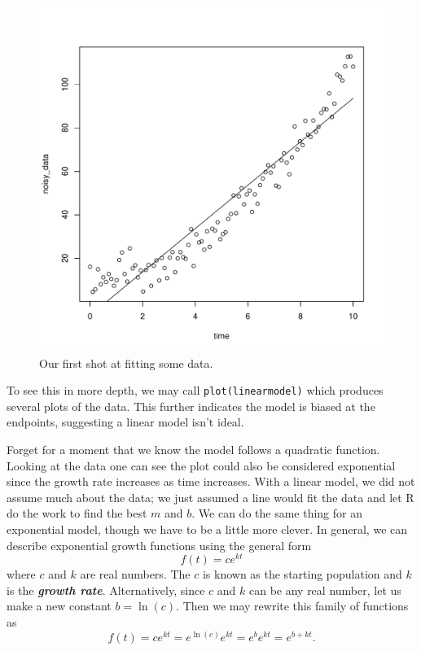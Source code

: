 \documentclass[12pt]{article}
\theoremstyle{remark}
\newcommand{\vocab}[1]{\textbf{\emph{#1}}}
\begin{document}
\begin{figure}[htbp]
\centering
\includegraphics[scale=0.5]{linear_model.pdf}
\caption{Our first shot at fitting some data.}
\label{linear}
\end{figure}

To see this in more depth, we may call \verb|plot(linearmodel)| which produces several plots of the data. This further indicates the model is biased at the endpoints, suggesting a linear model isn't ideal.

Forget for a moment that we know the model follows a quadratic function. Looking at the data one can see the plot could also be considered exponential since the growth rate increases as time increases. With a linear model, we did not assume much about the data; we just assumed a line would fit the data and let R do the work to find the best $m$ and $b$. We can do the same thing for an exponential model, though we have to be a little more clever. In general, we can describe exponential growth functions using the general form
\[
	f(t) = ce^{kt}
\]
where $c$ and $k$ are real numbers. The $c$ is known as the starting population and $k$ is the \vocab{growth rate}. Alternatively, since $c$ and $k$ can be any real number, let us make a new constant $b = \ln(c)$. Then we may rewrite this family of functions as
\[
	f(t) = ce^{kt} = e^{\ln(c)} e^{kt} = e^{b} e^{kt} = e^{b + kt}.
\]
\end{document}
